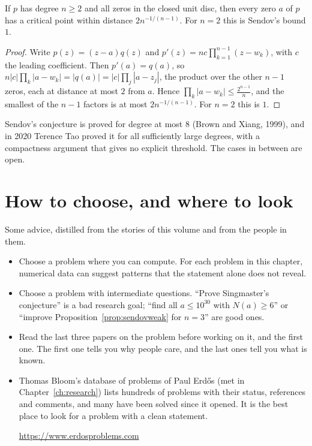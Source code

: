 \begin{proposition}\label{prop:sendovweak}
If $p$ has degree $n\ge2$ and all zeros in the closed unit disc, then every zero $a$ of $p$ has a critical point within distance $2n^{-1/(n-1)}$. For $n=2$ this is Sendov's bound $1$.
\end{proposition}

\begin{proof}
Write $p(z)=(z-a)q(z)$ and $p'(z)=nc\prod_{k=1}^{n-1}(z-w_k)$, with $c$ the leading coefficient. Then $p'(a)=q(a)$, so $n|c|\prod_k|a-w_k|=|q(a)|=|c|\prod_{j}|a-z_j|$, the product over the other $n-1$ zeros, each at distance at most $2$ from $a$. Hence $\prod_k|a-w_k|\le\frac{2^{n-1}}n$, and the smallest of the $n-1$ factors is at most $2n^{-1/(n-1)}$. For $n=2$ this is $1$.
\end{proof}

Sendov's conjecture is proved for degree at most $8$ (Brown and Xiang, 1999), and in 2020 Terence Tao proved it for all sufficiently large degrees, with a compactness argument that gives no explicit threshold. The cases in between are open.

\section{How to choose, and where to look}

Some advice, distilled from the stories of this volume and from the people in them.
\begin{itemize}
\item Choose a problem where you can compute. For each problem in this chapter, numerical data can suggest patterns that the statement alone does not reveal.
\item Choose a problem with intermediate questions. ``Prove Singmaster's conjecture'' is a bad research goal; ``find all $a\le10^{30}$ with $N(a)\ge6$'' or ``improve Proposition~\ref{prop:sendovweak} for $n=3$'' are good ones.
\item Read the last three papers on the problem before working on it, and the first one. The first one tells you why people care, and the last ones tell you what is known.
\item Thomas Bloom's database of problems of Paul Erd\H os (met in Chapter~\ref{ch:research}) lists hundreds of problems with their status, references and comments, and many have been solved since it opened. It is the best place to look for a problem with a clean statement.
\par\noindent\url{https://www.erdosproblems.com}
\end{itemize}

